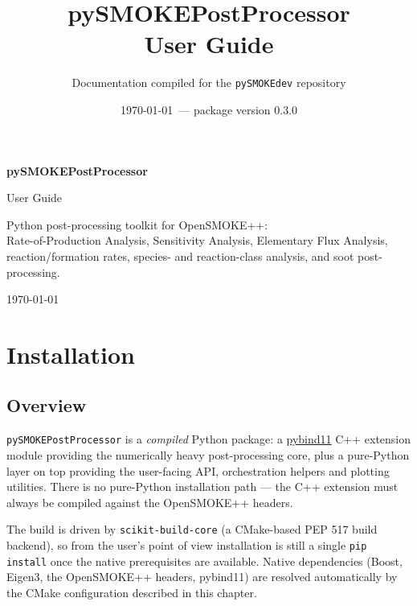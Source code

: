 \documentclass[11pt,a4paper]{report}
\title{\Huge \textbf{pySMOKEPostProcessor}\\[4mm]\Large User Guide}
\author{Documentation compiled for the \texttt{pySMOKEdev} repository}
\date{\today\ --- package version 0.3.0}
\newcommand{\pkg}[1]{\lstinline|#1|}
\begin{document}
\begin{titlepage}
\centering
\vspace*{3cm}
{\Huge\bfseries pySMOKEPostProcessor\par}
\vspace{0.5cm}
{\Large User Guide\par}
\vspace{1.5cm}
{\large Python post-processing toolkit for OpenSMOKE++:\\Rate-of-Production Analysis, Sensitivity Analysis, Elementary
Flux Analysis, reaction/formation rates, species- and reaction-class
analysis, and soot post-processing.\par}
\vspace{2cm}
{\large \today\par}
\vfill
\end{titlepage}

\tableofcontents
\clearpage

\part{Installation}

\chapter{Overview}

\texttt{pySMOKEPostProcessor} is a \emph{compiled} Python package: a
\href{https://github.com/pybind/pybind11}{pybind11} C++ extension module
providing the numerically heavy post-processing core, plus a pure-Python
layer on top providing the user-facing API, orchestration helpers and
plotting utilities. There is no pure-Python installation path --- the C++
extension must always be compiled against the OpenSMOKE++ headers.

The build is driven by \pkg{scikit-build-core} (a CMake-based PEP 517 build
backend), so from the user's point of view installation is still a single
\pkg{pip install} once the native prerequisites are available. Native
dependencies (Boost, Eigen3, the OpenSMOKE++ headers, pybind11) are resolved
automatically by the CMake configuration described in this chapter.
\end{document}
